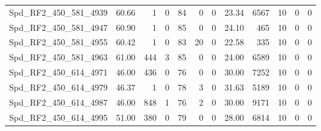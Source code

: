 \begin{longtable}[c]{@{}lrrrrrrrrrrr@{}}
Spd\_RF2\_450\_581\_4939     & 60.66                  & 1                       & 0                       & 84                     & 0                       & 0                       & 23.34                   & 6567                     & 10                       & 0                        & 0                        \\
Spd\_RF2\_450\_581\_4947     & 60.90                  & 1                       & 0                       & 85                     & 0                       & 0                       & 24.10                   & 465                      & 10                       & 0                        & 0                        \\
Spd\_RF2\_450\_581\_4955     & 60.42                  & 1                       & 0                       & 83                     & 20                      & 0                       & 22.58                   & 335                      & 10                       & 0                        & 0                        \\
Spd\_RF2\_450\_581\_4963     & 61.00                  & 444                     & 3                       & 85                     & 0                       & 0                       & 24.00                   & 6589                     & 10                       & 0                        & 0                        \\
Spd\_RF2\_450\_614\_4971     & 46.00                  & 436                     & 0                       & 76                     & 0                       & 0                       & 30.00                   & 7252                     & 10                       & 0                        & 0                        \\
Spd\_RF2\_450\_614\_4979     & 46.37                  & 1                       & 0                       & 78                     & 3                       & 0                       & 31.63                   & 5189                     & 10                       & 0                        & 0                        \\
Spd\_RF2\_450\_614\_4987     & 46.00                  & 848                     & 1                       & 76                     & 2                       & 0                       & 30.00                   & 9171                     & 10                       & 0                        & 0                        \\
Spd\_RF2\_450\_614\_4995     & 51.00                  & 380                     & 0                       & 79                     & 0                       & 0                       & 28.00                   & 6814                     & 10                       & 0                        & 0                        \\

\end{longtable}
